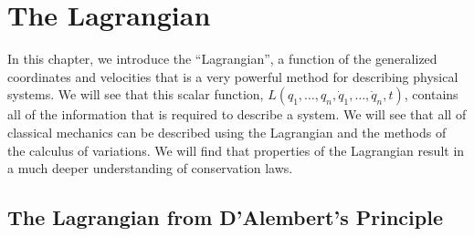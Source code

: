 \chapter{The Lagrangian}
In this chapter, we introduce the ``Lagrangian'', a function of the generalized coordinates and velocities that is a very powerful method for describing physical systems. We will see that this scalar function, $L(q_1,\dots ,q_n,\dot{q}_1,\dots ,\dot{q}_n,t)$, contains all of the information that is required to describe a system. We will see that all of classical mechanics can be described using the Lagrangian and the methods of the calculus of variations. We will find that properties of the Lagrangian result in a much deeper understanding of conservation laws. 

\section{The Lagrangian from D'Alembert's Principle}
